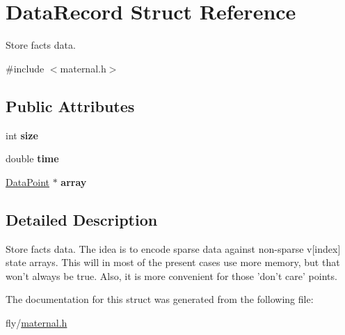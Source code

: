 \hypertarget{structDataRecord}{
\section{DataRecord Struct Reference}
\label{structDataRecord}
}


Store facts data.  


{\ttfamily \#include $<$maternal.h$>$}\subsection*{Public Attributes}
\begin{DoxyCompactItemize}
\item 
\hypertarget{structDataRecord_a7d5991ea343109810f30c047e2f74964}{
int {\bfseries size}}
\label{structDataRecord_a7d5991ea343109810f30c047e2f74964}

\item 
\hypertarget{structDataRecord_a41b1c25368bd327f18ee869ba7d872cc}{
double {\bfseries time}}
\label{structDataRecord_a41b1c25368bd327f18ee869ba7d872cc}

\item 
\hypertarget{structDataRecord_a8fcd5fd97a7390ab36f870a8a6243fca}{
\hyperlink{structDataPoint}{DataPoint} $\ast$ {\bfseries array}}
\label{structDataRecord_a8fcd5fd97a7390ab36f870a8a6243fca}

\end{DoxyCompactItemize}


\subsection{Detailed Description}
Store facts data. The idea is to encode sparse data against non-\/sparse v\mbox{[}index\mbox{]} state arrays. This will in most of the present cases use more memory, but that won't always be true. Also, it is more convenient for those 'don't care' points. 

The documentation for this struct was generated from the following file:\begin{DoxyCompactItemize}
\item 
fly/\hyperlink{maternal_8h}{maternal.h}\end{DoxyCompactItemize}
